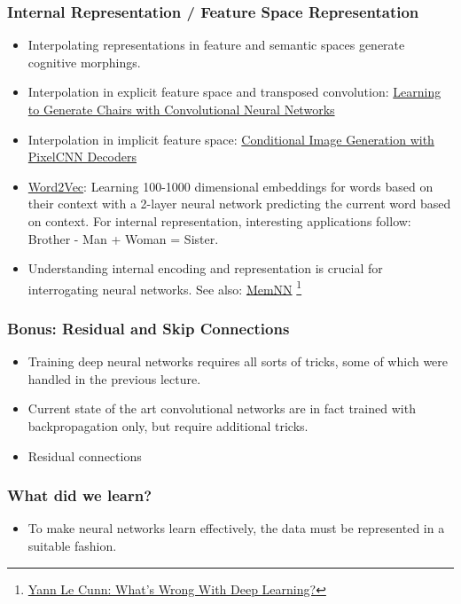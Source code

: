 \documentclass[8pt]{beamer}
\begin{document}
\begin{frame}
\frametitle{Internal Representation / Feature Space Representation}
 \begin{itemize}
  \item Interpolating representations in feature and semantic spaces generate cognitive morphings.
  \item Interpolation in explicit feature space and transposed convolution:
        \href{https://www.youtube.com/watch?v=QCSW4isBDL0}{Learning to Generate Chairs with Convolutional Neural Networks}
  \item Interpolation in implicit feature space:
        \href{https://arxiv.org/abs/1606.05328}{Conditional Image Generation with PixelCNN Decoders}
  \item \href{http://deeplearning4j.org/word2vec.html}{Word2Vec}: Learning 100-1000 dimensional embeddings for words based on their context with a 2-layer neural network
        predicting the current word based on context. For internal representation, interesting applications follow: Brother - Man + Woman = Sister.
  \item Understanding internal encoding and representation is crucial for interrogating neural networks. See also: \href{http://arxiv.org/pdf/1410.3916v11.pdf}{MemNN}
        \footnote{\href{http://www.pamitc.org/cvpr15/files/lecun-20150610-cvpr-keynote.pdf}{Yann Le Cunn: What's Wrong With Deep Learning?}}
 \end{itemize}
\end{frame}

\begin{frame}
\frametitle{Bonus: Residual and Skip Connections}
 \begin{itemize}
  \item Training deep neural networks requires all sorts of tricks, some of which were handled in the previous lecture.
  \item Current state of the art convolutional networks are in fact trained with backpropagation only, but require additional tricks.
  \item Residual connections
  {}
 \end{itemize}
\end{frame}

\begin{frame}
\frametitle{What did we learn?}
 \begin{itemize}
  \item To make neural networks learn effectively, the data must be represented in a suitable fashion.
 \end{itemize}
\end{frame}
\end{document}
